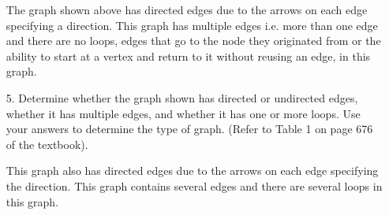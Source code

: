 \documentclass[12pt]{article}
\newcommand\bufsub{\vspace{1.0in}}
\newenvironment{answer}{\larger[2]}{}
\begin{document}
\begin{enumerate}
\begin{answer}
    The graph shown above has directed edges due to the arrows on each edge specifying a direction. This graph has multiple edges i.e. more than one edge and there are no loops, edges that go to the node they originated from or the ability to start at a vertex and return to it without reusing an edge, in this graph.
\end{answer}
\bufsub


\item[5.] Determine whether the graph shown has directed or undirected edges, whether it has multiple edges, and whether it has one or more loops. Use your answers to determine the type of graph. (Refer to Table 1 on page 676 of the textbook).

\hspace{42.0mm}

\vfill

\begin{answer}
    This graph also has directed edges due to the arrows on each edge specifying the direction. This graph contains several edges and there are several loops in this graph. 
\end{answer}

\end{enumerate} %
\end{document}
